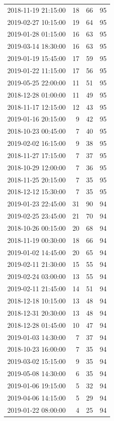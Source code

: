 \begin{tabular}{lrrr}
2018-11-19 21:15:00 & 18 & 66 & 95 \\
2019-02-27 10:15:00 & 19 & 64 & 95 \\
2019-01-28 01:15:00 & 16 & 63 & 95 \\
2019-03-14 18:30:00 & 16 & 63 & 95 \\
2019-01-19 15:45:00 & 17 & 59 & 95 \\
2019-01-22 11:15:00 & 17 & 56 & 95 \\
2019-05-25 22:00:00 & 11 & 51 & 95 \\
2018-12-28 01:00:00 & 11 & 49 & 95 \\
2018-11-17 12:15:00 & 12 & 43 & 95 \\
2019-01-16 20:15:00 & 9 & 42 & 95 \\
2018-10-23 00:45:00 & 7 & 40 & 95 \\
2019-02-02 16:15:00 & 9 & 38 & 95 \\
2018-11-27 17:15:00 & 7 & 37 & 95 \\
2018-10-29 12:00:00 & 7 & 36 & 95 \\
2018-11-25 20:15:00 & 7 & 35 & 95 \\
2018-12-12 15:30:00 & 7 & 35 & 95 \\
2019-01-23 22:45:00 & 31 & 90 & 94 \\
2019-02-25 23:45:00 & 21 & 70 & 94 \\
2018-10-26 00:15:00 & 20 & 68 & 94 \\
2018-11-19 00:30:00 & 18 & 66 & 94 \\
2019-01-02 14:45:00 & 20 & 65 & 94 \\
2019-02-11 21:30:00 & 15 & 55 & 94 \\
2019-02-24 03:00:00 & 13 & 55 & 94 \\
2019-02-11 21:45:00 & 14 & 51 & 94 \\
2018-12-18 10:15:00 & 13 & 48 & 94 \\
2018-12-31 20:30:00 & 13 & 48 & 94 \\
2018-12-28 01:45:00 & 10 & 47 & 94 \\
2019-01-03 14:30:00 & 7 & 37 & 94 \\
2018-10-23 16:00:00 & 7 & 35 & 94 \\
2019-03-02 15:15:00 & 9 & 35 & 94 \\
2019-05-08 14:30:00 & 6 & 35 & 94 \\
2019-01-06 19:15:00 & 5 & 32 & 94 \\
2019-04-06 14:15:00 & 5 & 29 & 94 \\
2019-01-22 08:00:00 & 4 & 25 & 94 \\

\end{tabular}
